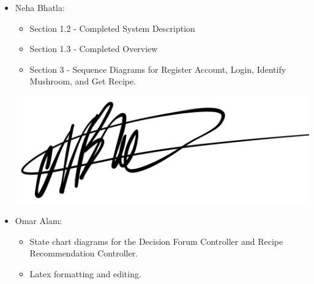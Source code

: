 \documentclass[]{article}
\begin{document}
\begin{itemize}
	\item Neha Bhatla:
	\begin{itemize} 
		\item Section 1.2 - Completed System Description
		\item Section 1.3 - Completed Overview
		\item Section 3 - Sequence Diagrams for Register Account, Login, Identify Mushroom, and Get Recipe.
	\end{itemize}
	\includegraphics[scale=0.05]{neha_signature.jpeg}\\ 
	\item Omar Alam:
	\begin{itemize}
		\item State chart diagrams for the Decision Forum Controller and Recipe Recommendation Controller.
        \item Latex formatting and editing.
    

\end{itemize}
\end{itemize}
\end{document}
